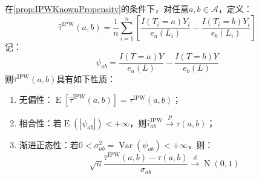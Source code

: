 \begin{property}\label{prop:IPWATEKnownPropensity}
	在\cref{prop:IPWKnownPropensity}的条件下，对任意$a,b\in\mathcal{A}$，定义：
	\begin{equation*}
		\hat{\tau}^{\text{IPW}}(a,b)=\frac{1}{n}\sum_{i=1}^n\left[\frac{I(T_i=a)Y_i}{e_a(L_i)}-\frac{I(T_i=b)Y_i}{e_b(L_i)}\right]
	\end{equation*}
	记：
	\begin{equation*}
		\psi_{ab}=\frac{I(T=a)Y}{e_a(L)}-\frac{I(T=b)Y}{e_b(L)}
	\end{equation*}
	则$\hat{\tau}^{\text{IPW}}(a,b)$具有如下性质：
	\begin{enumerate}
		\item 无偏性：$\operatorname{E}[\hat{\tau}^{\text{IPW}}(a,b)]=\tau^{\text{IPW}}(a,b)$；
		\item 相合性：若$\operatorname{E}(|\psi_{ab}|)<+\infty$，则$\hat{\tau}_{ab}^{\text{IPW}}\overset{P}{\longrightarrow}\tau(a,b)$；
		\item 渐进正态性：若$0<\sigma_{ab}^2=\operatorname{Var}(\psi_{ab})<+\infty$，则：
		\begin{equation*}
			\sqrt{n}\frac{\hat{\tau}^{\text{IPW}}(a,b)-\tau(a,b)}{\sigma_{ab}}\overset{d}{\longrightarrow}\operatorname{N}(0,1)
		\end{equation*}
	\end{enumerate}
\end{property}
